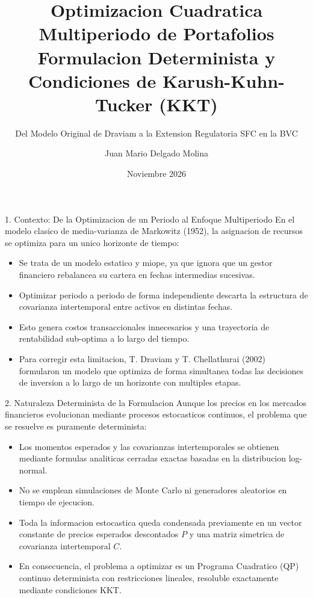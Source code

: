 \documentclass[aspectratio=169,10pt]{beamer}
\title{Optimizacion Cuadratica Multiperiodo de Portafolios\\Formulacion Determinista y Condiciones de Karush-Kuhn-Tucker (KKT)}
\subtitle{Del Modelo Original de Draviam a la Extension Regulatoria SFC en la BVC}
\author{Juan Mario Delgado Molina}
\institute{Curso de Optimizacion Lineal y Convexa\\Investigacion de Operaciones / Matematicas Aplicadas}
\date{Noviembre 2026}
\begin{document}
\begin{frame}
  \titlepage
\end{frame}

\begin{frame}{1. Contexto: De la Optimizacion de un Periodo al Enfoque Multiperiodo}
  En el modelo clasico de media-varianza de Markowitz (1952), la asignacion de recursos se optimiza para un unico horizonte de tiempo:
  \vspace{0.3cm}
  \begin{itemize}
    \item Se trata de un modelo estatico y miope, ya que ignora que un gestor financiero rebalancea su cartera en fechas intermedias sucesivas.
    \vspace{0.2cm}
    \item Optimizar periodo a periodo de forma independiente descarta la estructura de covarianza intertemporal entre activos en distintas fechas.
    \vspace{0.2cm}
    \item Esto genera costos transaccionales innecesarios y una trayectoria de rentabilidad sub-optima a lo largo del tiempo.
    \vspace{0.2cm}
    \item Para corregir esta limitacion, T. Draviam y T. Chellathurai (2002) formularon un modelo que optimiza de forma simultanea todas las decisiones de inversion a lo largo de un horizonte con multiples etapas.
  \end{itemize}
\end{frame}

\begin{frame}{2. Naturaleza Determinista de la Formulacion}
  Aunque los precios en los mercados financieros evolucionan mediante procesos estocasticos continuos, el problema que se resuelve es puramente determinista:
  \vspace{0.3cm}
  \begin{itemize}
    \item Los momentos esperados y las covarianzas intertemporales se obtienen mediante formulas analiticas cerradas exactas basadas en la distribucion log-normal.
    \vspace{0.2cm}
    \item No se emplean simulaciones de Monte Carlo ni generadores aleatorios en tiempo de ejecucion.
    \vspace{0.2cm}
    \item Toda la informacion estocastica queda condensada previamente en un vector constante de precios esperados descontados $P$ y una matriz simetrica de covarianza intertemporal $C$.
    \vspace{0.2cm}
    \item En consecuencia, el problema a optimizar es un Programa Cuadratico (QP) continuo determinista con restricciones lineales, resoluble exactamente mediante condiciones KKT.
  \end{itemize}
\end{frame}
\end{document}
